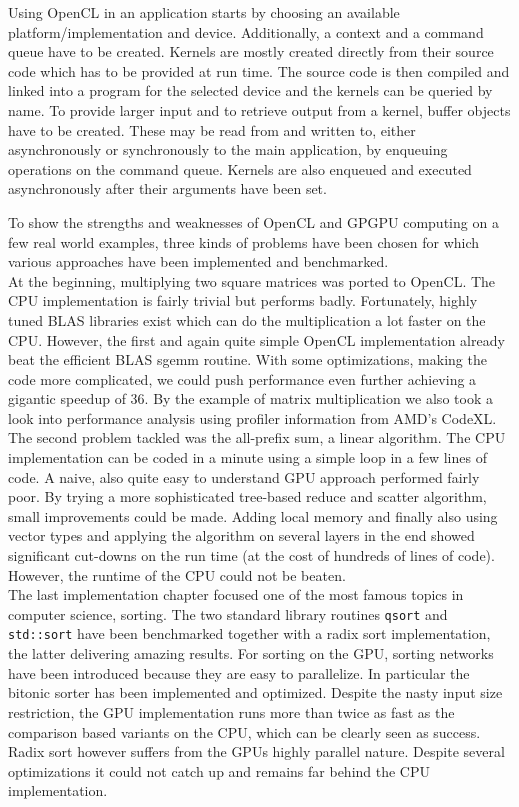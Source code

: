 Using OpenCL in an application starts by choosing an available platform/implementation and device. Additionally, a context and a command queue have to be created. Kernels are mostly created directly from their source code which has to be provided at run time. The source code is then compiled and linked into a program for the selected device and the kernels can be queried by name. To provide larger input and to retrieve output from a kernel, buffer objects have to be created. These may be read from and written to, either asynchronously or synchronously to the main application, by enqueuing operations on the command queue. Kernels are also enqueued and executed asynchronously after their arguments have been set.

To show the strengths and weaknesses of OpenCL and GPGPU computing on a few real world examples, three kinds of problems have been chosen for which various approaches have been implemented and benchmarked. \\
At the beginning, multiplying two square matrices was ported to OpenCL. The CPU implementation is fairly trivial but performs badly. Fortunately, highly tuned BLAS libraries exist which can do the multiplication a lot faster on the CPU. However, the first and again quite simple OpenCL implementation already beat the efficient BLAS sgemm routine. With some optimizations, making the code more complicated, we could push performance even further achieving a gigantic speedup of 36.
By the example of matrix multiplication we also took a look into performance analysis using profiler information from AMD's CodeXL. \\
The second problem tackled was the all-prefix sum, a linear algorithm. The CPU implementation can be coded in a minute using a simple loop in a few lines of code. A naive, also quite easy to understand GPU approach performed fairly poor. By trying a more sophisticated tree-based reduce and scatter algorithm, small improvements could be made. Adding local memory and finally also using vector types and applying the algorithm on several layers in the end showed significant cut-downs on the run time (at the cost of hundreds of lines of code). However, the runtime of the CPU could not be beaten. \\
The last implementation chapter focused one of the most famous topics in computer science, sorting. The two standard library routines \lstinline!qsort! and \lstinline!std::sort! have been benchmarked together with a radix sort implementation, the latter delivering amazing results. For sorting on the GPU, sorting networks have been introduced because they are easy to parallelize. In particular the bitonic sorter has been implemented and optimized. Despite the nasty input size restriction, the GPU implementation runs more than twice as fast as the comparison based variants on the CPU, which can be clearly seen as success. Radix sort however suffers from the GPUs highly parallel nature. Despite several optimizations it could not catch up and remains far behind the CPU implementation.

